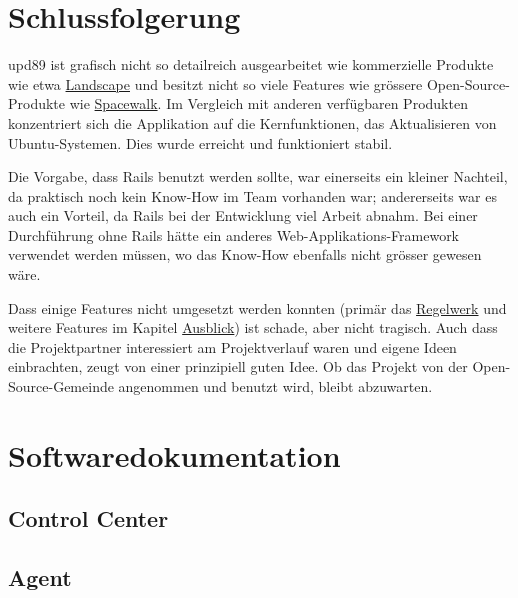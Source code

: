 \section{Schlussfolgerung}
\label{conclusion}

\gls{upd89} ist grafisch nicht so detailreich ausgearbeitet wie kommerzielle Produkte wie etwa \hyperref[sec:analysis:competition:landscape]{Landscape} und besitzt nicht so viele Features wie grössere Open-Source-Produkte wie \hyperref[sec:analysis:competition:spacewalk]{Spacewalk}. Im Vergleich mit anderen verfügbaren Produkten konzentriert sich die Applikation auf die Kernfunktionen, das Aktualisieren von Ubuntu-Systemen. Dies wurde erreicht und funktioniert stabil.

Die Vorgabe, dass Rails benutzt werden sollte, war einerseits ein kleiner Nachteil, da praktisch noch kein Know-How im Team vorhanden war; andererseits war es auch ein Vorteil, da Rails bei der Entwicklung viel Arbeit abnahm. Bei einer Durchführung ohne Rails hätte ein anderes Web-Applikations-Framework verwendet werden müssen, wo das Know-How ebenfalls nicht grösser gewesen wäre.

Dass einige Features nicht umgesetzt werden konnten (primär das \hyperref[sec:ausblick:regelwerk]{Regelwerk} und weitere Features im Kapitel \hyperref[sec:ausblick]{Ausblick}) ist schade, aber nicht tragisch. Auch dass die Projektpartner interessiert am Projektverlauf waren und eigene Ideen einbrachten, zeugt von einer prinzipiell guten Idee. Ob das Projekt von der Open-Source-Gemeinde angenommen und benutzt wird, bleibt abzuwarten.

\xxx

\section{Softwaredokumentation} \label{documentation}



\subsection*{Control Center}



\subsection*{Agent}
